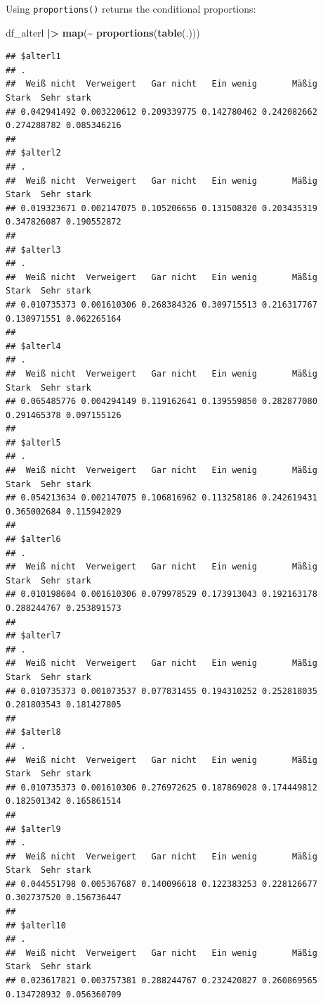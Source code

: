 \documentclass[
  doc]{apa6}
\newenvironment{Shaded}{\begin{snugshade}}{\end{snugshade}}
\newcommand{\FunctionTok}[1]{\textcolor[rgb]{0.13,0.29,0.53}{\textbf{#1}}}
\newcommand{\NormalTok}[1]{#1}
\newcommand{\SpecialCharTok}[1]{\textcolor[rgb]{0.81,0.36,0.00}{\textbf{#1}}}
\begin{document}
Using \texttt{proportions()} returns the conditional proportions:

\begin{Shaded}
\begin{Highlighting}[]
\NormalTok{df\_alterl }\SpecialCharTok{|\textgreater{}} 
  \FunctionTok{map}\NormalTok{(}\SpecialCharTok{\textasciitilde{}} \FunctionTok{proportions}\NormalTok{(}\FunctionTok{table}\NormalTok{(.)))}
\end{Highlighting}
\end{Shaded}

\begin{verbatim}
## $alterl1
## .
##  Weiß nicht  Verweigert   Gar nicht   Ein wenig       Mäßig       Stark  Sehr stark 
## 0.042941492 0.003220612 0.209339775 0.142780462 0.242082662 0.274288782 0.085346216 
## 
## $alterl2
## .
##  Weiß nicht  Verweigert   Gar nicht   Ein wenig       Mäßig       Stark  Sehr stark 
## 0.019323671 0.002147075 0.105206656 0.131508320 0.203435319 0.347826087 0.190552872 
## 
## $alterl3
## .
##  Weiß nicht  Verweigert   Gar nicht   Ein wenig       Mäßig       Stark  Sehr stark 
## 0.010735373 0.001610306 0.268384326 0.309715513 0.216317767 0.130971551 0.062265164 
## 
## $alterl4
## .
##  Weiß nicht  Verweigert   Gar nicht   Ein wenig       Mäßig       Stark  Sehr stark 
## 0.065485776 0.004294149 0.119162641 0.139559850 0.282877080 0.291465378 0.097155126 
## 
## $alterl5
## .
##  Weiß nicht  Verweigert   Gar nicht   Ein wenig       Mäßig       Stark  Sehr stark 
## 0.054213634 0.002147075 0.106816962 0.113258186 0.242619431 0.365002684 0.115942029 
## 
## $alterl6
## .
##  Weiß nicht  Verweigert   Gar nicht   Ein wenig       Mäßig       Stark  Sehr stark 
## 0.010198604 0.001610306 0.079978529 0.173913043 0.192163178 0.288244767 0.253891573 
## 
## $alterl7
## .
##  Weiß nicht  Verweigert   Gar nicht   Ein wenig       Mäßig       Stark  Sehr stark 
## 0.010735373 0.001073537 0.077831455 0.194310252 0.252818035 0.281803543 0.181427805 
## 
## $alterl8
## .
##  Weiß nicht  Verweigert   Gar nicht   Ein wenig       Mäßig       Stark  Sehr stark 
## 0.010735373 0.001610306 0.276972625 0.187869028 0.174449812 0.182501342 0.165861514 
## 
## $alterl9
## .
##  Weiß nicht  Verweigert   Gar nicht   Ein wenig       Mäßig       Stark  Sehr stark 
## 0.044551798 0.005367687 0.140096618 0.122383253 0.228126677 0.302737520 0.156736447 
## 
## $alterl10
## .
##  Weiß nicht  Verweigert   Gar nicht   Ein wenig       Mäßig       Stark  Sehr stark 
## 0.023617821 0.003757381 0.288244767 0.232420827 0.260869565 0.134728932 0.056360709
\end{verbatim}
\end{document}
